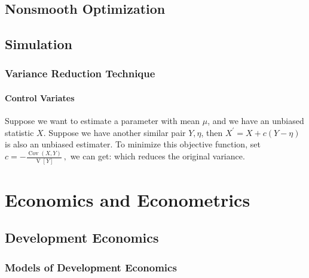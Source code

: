 \documentclass[12pt]{report}
\begin{document}
\clearpage
\section{Nonsmooth Optimization}

\clearpage
\section{Simulation}

\subsection{Variance Reduction Technique}

\subsubsection{Control Variates}
Suppose we want to estimate a parameter with mean $\mu$, and we have an unbiased statistic $X$. Suppose we have another similar pair $Y,\eta$,
then $X^{\prime}=X+c(Y-\eta)$ is also an unbiased estimater.
To minimize this objective function, set $c=-\frac{\operatorname{Cov}(X,Y)}{\operatorname{V}[Y]}\mathrm{~,}$ we can get:
which reduces the original variance.

\clearpage
\chapter{Economics and Econometrics}

\section{Development Economics}

\subsection{Models of Development Economics}
\end{document}

